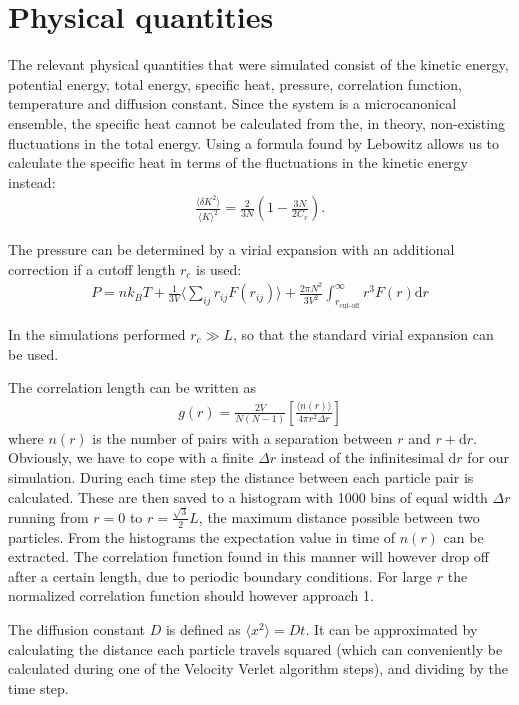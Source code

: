 \section{Physical quantities}
The relevant physical quantities that were simulated consist of the kinetic energy, potential energy, total energy, specific heat, pressure, correlation function, temperature and diffusion constant. Since the system is a microcanonical ensemble, the specific heat cannot be calculated from the, in theory, non-existing fluctuations in the total energy\cite{jos}. Using a formula found by Lebowitz \cite{lebowitz1967ensemble} allows us to calculate the specific heat in terms of the fluctuations in the kinetic energy instead:
\begin{gather*}
    \frac{\langle \delta K^2\rangle}{\langle K\rangle^2}=\frac{2}{3N}\left( 1-\frac{3N}{2C_v}\right).
\end{gather*}

The pressure can be determined by a virial expansion with an additional correction if a cutoff length $r_c$ is used:
\begin{gather*}
    P = nk_BT + \frac{1}{3V}\Big \langle \sum_{ij} r_{ij}F(r_{ij})\Big \rangle + \frac{2\pi N^2}{3V^2}\int_{r_{\text{cut-off}}}^{\infty}r^3 F(r) \text{d}r
\end{gather*}

In the simulations performed $r_c \gg L$, so that the standard virial expansion can be used.

The correlation length can be written as
\begin{gather*}
    g(r)=\frac{2V}{N(N-1)}\left[\frac{\langle n(r)\rangle}{4\pi r^2\Delta r}\right]
\end{gather*}
where $n(r)$ is the number of pairs with a separation between $r$ and $r + \mathrm{d}r$. Obviously, we have to cope with a finite $\Delta r$ instead of the infinitesimal $\mathrm{d}r$ for our simulation. During each time step the distance between each particle pair is calculated. These are then saved to a histogram with 1000 bins of equal width $\Delta r$ running from $r = 0$ to $r = \frac{\sqrt{3}}{2}L$, the maximum distance possible between two particles. From the histograms the expectation value in time of $n(r)$ can be extracted. The correlation function found in this manner will however drop off after a certain length, due to periodic boundary conditions. For large $r$ the normalized correlation function should however approach 1.

The diffusion constant $D$ is defined as $\langle x^2\rangle = Dt$. It can be approximated by calculating the distance each particle travels squared (which can conveniently be calculated during one of the Velocity Verlet algorithm steps), and dividing by the time step.